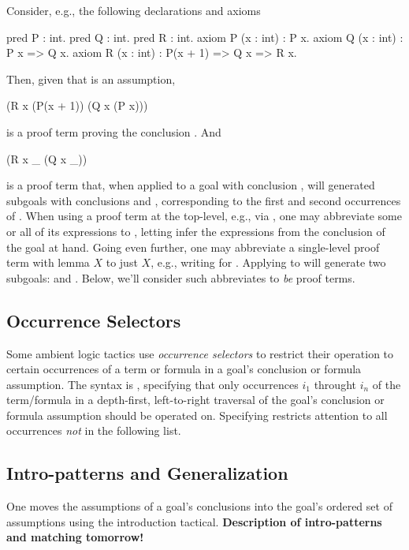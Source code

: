 Consider, e.g., the following declarations and axioms
\begin{easycrypt}{}{}
pred P : int.
pred Q : int.
pred R : int.
axiom P (x : int) : P x.
axiom Q (x : int) : P x => Q x.
axiom R (x : int) : P(x + 1) => Q x => R x.
\end{easycrypt}
Then, given that  is an assumption,
\begin{easycrypt}{}{}
(R x (P(x + 1)) (Q x (P x)))
\end{easycrypt}
is a proof term proving the conclusion . And
\begin{easycrypt}{}{}
(R x _ (Q x _))
\end{easycrypt}
is a proof term that, when applied to a goal with conclusion ,
will generated subgoals with conclusions  and ,
corresponding to the first and second occurrences of \ec{_}.  When
using a proof term at the top-level, e.g., via , one may
abbreviate some or all of its expressions to \ec{_}, letting
\EasyCrypt infer the expressions from the conclusion of the goal at
hand. Going even further, one may abbreviate a single-level proof term
with lemma $X$ to just $X$, e.g., writing  for .
Applying  to  will generate two subgoals: 
and . Below, we'll consider such abbreviates to \emph{be} proof
terms.

\subsection{Occurrence Selectors}
\label{OccSels}

Some ambient logic tactics use \emph{occurrence selectors} to restrict
their operation to certain occurrences of a term or formula in a
goal's conclusion or formula assumption. The syntax is , specifying that only occurrences $i_1$
throught $i_n$ of the term/formula in a depth-first, left-to-right
traversal of the goal's conclusion or formula assumption should be
operated on. Specifying 
restricts attention to all occurrences \emph{not} in the following
list.

\subsection{Intro-patterns and Generalization}
\label{IntroPatterns}

One moves the assumptions of a goal's conclusions into the goal's
ordered set of assumptions using the introduction tactical.
\textbf{Description of intro-patterns and matching tomorrow!}

